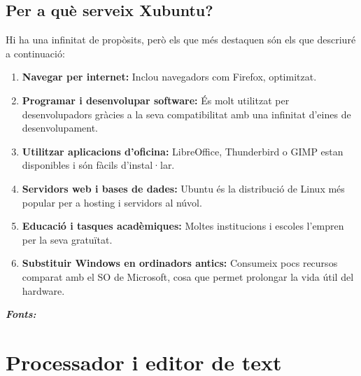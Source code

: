 \subsection*{Per a què serveix Xubuntu?}
Hi ha una infinitat de propòsits, però els que més destaquen són els que descriuré a continuació:
\begin{enumerate}
 \item \textbf{Navegar per internet:} Inclou navegadors com Firefox, optimitzat.
 \item \textbf{Programar i desenvolupar software:} És molt utilitzat per desenvolupadors gràcies a la seva compatibilitat amb una infinitat d’eines de desenvolupament.
 \item \textbf{Utilitzar aplicacions d’oficina:} LibreOffice, Thunderbird o GIMP estan disponibles i són fàcils d’instal·lar.
 \item \textbf{Servidors web i bases de dades:} Ubuntu és la distribució de Linux més popular per a hosting i servidors al núvol.
 \item \textbf{Educació i tasques acadèmiques:} Moltes institucions i escoles l’empren per la seva gratuïtat.
 \item \textbf{Substituir Windows en ordinadors antics:} Consumeix pocs recursos comparat amb el SO de Microsoft, cosa que permet prolongar la vida útil del hardware.
\end{enumerate}

\textit{\textbf{Fonts:}} \cite{GD}








\section{Processador i editor de text} \label{sec:Kile}

%
%


